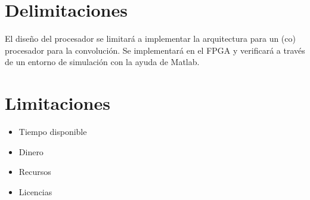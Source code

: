\section{Delimitaciones}
El diseño del procesador se limitará a implementar la arquitectura para un (co) procesador para la convolución. Se implementará en el FPGA y verificará a través de un entorno de simulación con la ayuda de Matlab.  

\section{Limitaciones}
\begin{itemize}
\item Tiempo disponible
\item Dinero
\item Recursos
\item Licencias 
\end{itemize}
